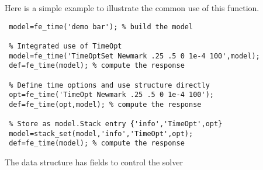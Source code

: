 Here is a simple example to illustrate the common use of this function.
\begin{verbatim}
 model=fe_time('demo bar'); % build the model

 % Integrated use of TimeOpt
 model=fe_time('TimeOptSet Newmark .25 .5 0 1e-4 100',model);
 def=fe_time(model); % compute the response

 % Define time options and use structure directly
 opt=fe_time('TimeOpt Newmark .25 .5 0 1e-4 100');
 def=fe_time(opt,model); % compute the response

 % Store as model.Stack entry {'info','TimeOpt',opt}
 model=stack_set(model,'info','TimeOpt',opt);
 def=fe_time(model); % compute the response
\end{verbatim}%




The  data structure has fields to control the solver

